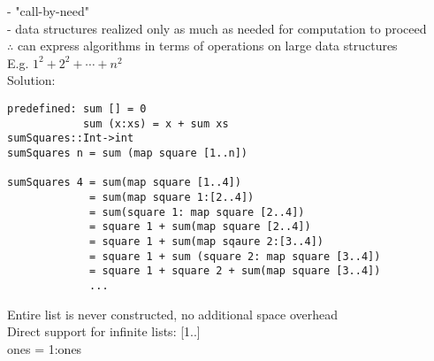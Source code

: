 \documentclass[11pt]{article}
\begin{document}
- "call-by-need" \\

- data structures realized only as much as needed for computation to proceed \\

$\therefore$ can express algorithms in terms of operations on large data structures \\

E.g. $1^2 + 2^2 + \cdots + n^2$ \\

Solution: 
\begin{verbatim}
predefined: sum [] = 0
            sum (x:xs) = x + sum xs
sumSquares::Int->int
sumSquares n = sum (map square [1..n])

sumSquares 4 = sum(map square [1..4])
             = sum(map square 1:[2..4])
             = sum(square 1: map square [2..4])
             = square 1 + sum(map square [2..4])
             = square 1 + sum(map sqaure 2:[3..4])
             = square 1 + sum (square 2: map square [3..4])
             = square 1 + square 2 + sum(map square [3..4])
             ...
\end{verbatim}

Entire list is never constructed, no additional space overhead \\

Direct support for infinite lists: [1..] \\

ones = 1:ones \\
\end{document}
